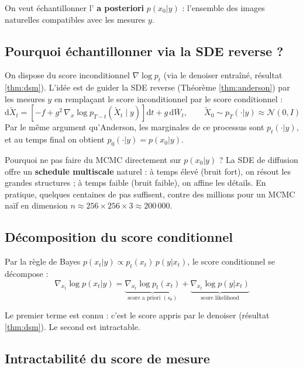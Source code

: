 \documentclass[12pt]{article}
\begin{document}
On veut échantillonner l' \textbf{a posteriori} $p(x_0 | y)$ : l'ensemble des images naturelles compatibles avec les mesures $y$.


\subsection{Pourquoi échantillonner via la SDE reverse ?}

On dispose du score inconditionnel $\nabla \log p_t$ (via le denoiser entraîné, résultat \ref{thm:dsm}). L'idée est de guider la SDE reverse (Théorème \ref{thm:anderson}) par les mesures $y$ en remplaçant le score inconditionnel par le score conditionnel :
\begin{equation}
    \mathrm{d}\tilde{X}_t = \left[-f + g^2\, \nabla_x \log p_{T-t}(\tilde{X}_t \mid y)\right]\mathrm{d}t + g\,\mathrm{d}\bar{W}_t, \qquad \tilde{X}_0 \sim p_T(\cdot | y) \approx \mathcal{N}(0, I)
    \label{eq:cond_reverse}
\end{equation}
Par le même argument qu'Anderson, les marginales de ce processus sont $p_t(\cdot | y)$, et au temps final on obtient $p_0(\cdot | y) = p(x_0 | y)$.

Pourquoi ne pas faire du MCMC directement sur $p(x_0 | y)$ ? La SDE de diffusion offre un \textbf{schedule multiscale} naturel : à temps élevé (bruit fort), on résout les grandes structures ; à temps faible (bruit faible), on affine les détails. En pratique, quelques centaines de pas suffisent, contre des millions pour un MCMC naïf en dimension $n \approx 256 \times 256 \times 3 \approx 200\,000$.


\subsection{Décomposition du score conditionnel}

Par la règle de Bayes $p(x_t | y) \propto p_t(x_t)\, p(y | x_t)$, le score conditionnel se décompose :
\begin{equation}
    \boxed{\nabla_{x_t} \log p(x_t|y) = \underbrace{\nabla_{x_t} \log p_t(x_t)}_{\text{score a priori } (s_\theta)} + \underbrace{\nabla_{x_t} \log p(y|x_t)}_{\text{score likelihood}}}
    \label{eq:score_decomp}
\end{equation}

Le premier terme est connu : c'est le score appris par le denoiser (résultat \ref{thm:dsm}). Le second est intractable.


\subsection{Intractabilité du score de mesure}
\end{document}
